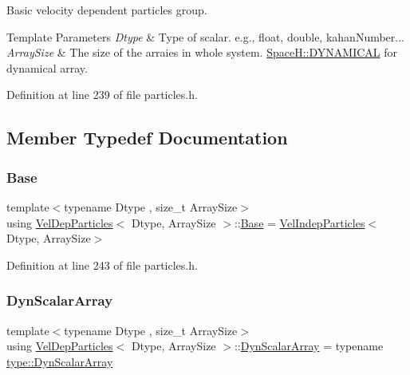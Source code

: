 Basic velocity dependent particles group. 


\begin{DoxyTemplParams}{Template Parameters}
{\em Dtype} & Type of scalar. e.\+g., float, double, kahan\+Number... \\
\hline
{\em Array\+Size} & The size of the arraies in whole system. \mbox{\hyperlink{namespace_space_h_a3e55b9bc2a9e10c08ce8121bce11244a}{Space\+H\+::\+D\+Y\+N\+A\+M\+I\+C\+AL}} for dynamical array. \\
\hline
\end{DoxyTemplParams}


Definition at line 239 of file particles.\+h.



\subsection{Member Typedef Documentation}
\mbox{\label{class_vel_dep_particles_abd70b1e397d95d52875997ead48f3217}} 
\subsubsection{\texorpdfstring{Base}{Base}}
{\footnotesize\ttfamily template$<$typename Dtype , size\+\_\+t Array\+Size$>$ \\
using \mbox{\hyperlink{class_vel_dep_particles}{Vel\+Dep\+Particles}}$<$ Dtype, Array\+Size $>$\+::\mbox{\hyperlink{class_vel_dep_particles_abd70b1e397d95d52875997ead48f3217}{Base}} =  \mbox{\hyperlink{class_vel_indep_particles}{Vel\+Indep\+Particles}}$<$Dtype, Array\+Size$>$}



Definition at line 243 of file particles.\+h.

\mbox{\label{class_vel_dep_particles_a7b95dc56c836ef3353326deae9f18662}} 
\subsubsection{\texorpdfstring{Dyn\+Scalar\+Array}{DynScalarArray}}
{\footnotesize\ttfamily template$<$typename Dtype , size\+\_\+t Array\+Size$>$ \\
using \mbox{\hyperlink{class_vel_dep_particles}{Vel\+Dep\+Particles}}$<$ Dtype, Array\+Size $>$\+::\mbox{\hyperlink{class_vel_indep_particles_a6bba8ac3f941a144214037a27ccaa119}{Dyn\+Scalar\+Array}} =  typename \mbox{\hyperlink{struct_space_h_1_1_proto_type_a8f3813f576517856e0ed74af9e5ffcb4}{type\+::\+Dyn\+Scalar\+Array}}}



